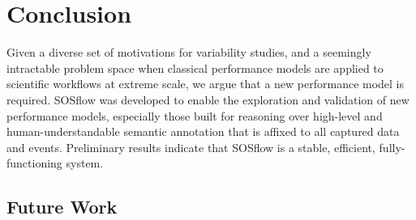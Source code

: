 
\section{Conclusion}

Given a diverse set of motivations for variability studies, and a
seemingly intractable problem space when classical performance models
are applied to scientific workflows at extreme scale, we argue that a
new performance model is required.
%
SOSflow was developed to enable the exploration and validation of new
performance models, especially those built for reasoning over
high-level and human-understandable semantic annotation that is
affixed to all captured data and events.
%
Preliminary results indicate that SOSflow is a stable, efficient,
fully-functioning system.



%



\subsection{Future Work}

